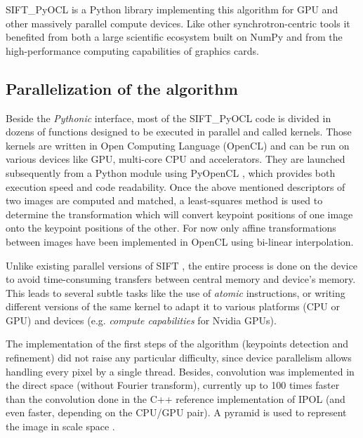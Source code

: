 \documentclass[preprint]{iucr}
\begin{document}
SIFT\_PyOCL is a Python library implementing this algorithm for GPU
and other massively parallel compute devices.
Like other synchrotron-centric tools \cite{pyhst2,pynx,pyfai} it benefited
from both a large scientific ecosystem built on NumPy \cite{numpy} and from
the high-performance computing capabilities of graphics cards.





\subsection{Parallelization of the algorithm}
Beside the \emph{Pythonic} interface, most of the
SIFT\_PyOCL code is divided in dozens of functions designed to be
executed in parallel and called kernels. Those kernels are written in Open
Computing Language (OpenCL) \cite{opencl} and  can be run on various
devices like GPU, multi-core CPU and accelerators.
They are launched subsequently from a Python module using PyOpenCL
\cite{pyopencl}, which provides both execution speed and code readability.
Once the above mentioned descriptors of two images are computed and matched, a
least-squares method is used to determine the transformation which will convert
keypoint positions of one image onto the keypoint positions of the other. For
now only affine transformations between images have been implemented in OpenCL
using bi-linear interpolation.

Unlike existing parallel versions of SIFT \cite{lu,rister,vasilyev}, the entire
process is done on the device to avoid time-consuming transfers between
central memory and device's memory.
This leads to several subtle tasks like the use of \emph{atomic} instructions,
or writing different versions of the same kernel to adapt it to various
platforms (CPU or GPU) and devices (e.g. \emph{compute capabilities} for
Nvidia GPUs).

The implementation of the first steps of the algorithm (keypoints detection and
refinement) did not raise any particular difficulty, since device parallelism
allows handling every pixel by a single thread.
Besides, convolution was implemented in the direct space (without Fourier
transform), currently up to 100 times faster than the convolution done in
the C++ reference implementation of IPOL \cite{ASIFT}
(and even faster, depending on the CPU/GPU pair).
A pyramid is used to represent the image in scale space \cite{Lowe04}.
\end{document}
